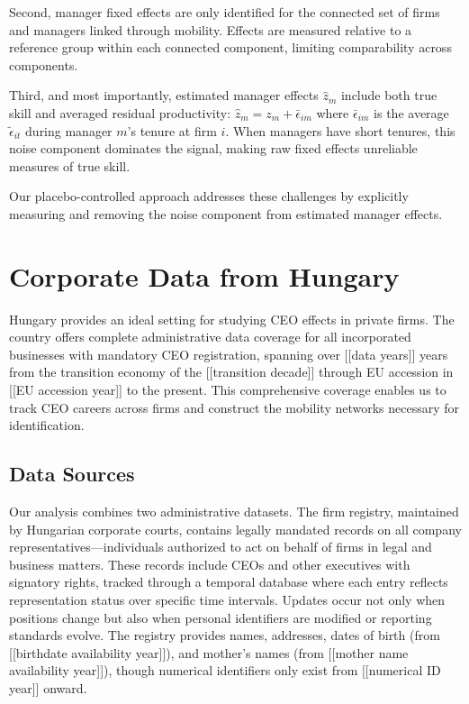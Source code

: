 \documentclass[11pt,a4paper]{article}
\begin{document}
Second, manager fixed effects are only identified for the connected set of firms and managers linked through mobility. Effects are measured relative to a reference group within each connected component, limiting comparability across components.

Third, and most importantly, estimated manager effects $\hat{z}_m$ include both true skill and averaged residual productivity: $\hat{z}_m = z_m + \bar{\epsilon}_{im}$ where $\bar{\epsilon}_{im}$ is the average $\tilde{\epsilon}_{it}$ during manager $m$'s tenure at firm $i$. When managers have short tenures, this noise component dominates the signal, making raw fixed effects unreliable measures of true skill.

Our placebo-controlled approach addresses these challenges by explicitly measuring and removing the noise component from estimated manager effects.

\section{Corporate Data from Hungary}

Hungary provides an ideal setting for studying CEO effects in private firms. The country offers complete administrative data coverage for all incorporated businesses with mandatory CEO registration, spanning over [[data years]] years from the transition economy of the [[transition decade]] through EU accession in [[EU accession year]] to the present. This comprehensive coverage enables us to track CEO careers across firms and construct the mobility networks necessary for identification.

\subsection{Data Sources}

Our analysis combines two administrative datasets. The firm registry, maintained by Hungarian corporate courts, contains legally mandated records on all company representatives—individuals authorized to act on behalf of firms in legal and business matters. These records include CEOs and other executives with signatory rights, tracked through a temporal database where each entry reflects representation status over specific time intervals. Updates occur not only when positions change but also when personal identifiers are modified or reporting standards evolve. The registry provides names, addresses, dates of birth (from [[birthdate availability year]]), and mother's names (from [[mother name availability year]]), though numerical identifiers only exist from [[numerical ID year]] onward.
\end{document}
